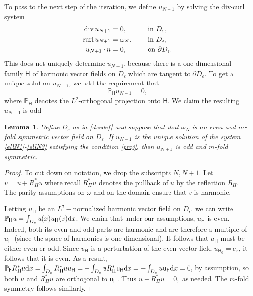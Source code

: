 \documentclass[11pt]{article}
\theoremstyle{plain}
\numberwithin{equation}{section}
\newtheorem{lemma}[thm]{Lemma}
\theoremstyle{remark}
\renewcommand{\div}{{\rm div}}
\newcommand{\rmd}{{\rm d}}
\newcommand{\curl}{{\rm curl}}
\newcommand{\ve}{{\varepsilon}}
\newcommand{\pa}{\partial}
\begin{document}
To pass to the next step of the iteration,
we define $u_{N+1}$ by solving the div-curl system
\begin{alignat}{2}
  \label{ellN1}
  \div \,u_{N+1} &= 0, &&\text{ in } D_\ve,\\
  \curl \,u_{N+1} &= \omega_N,&&\text{ in } D_\ve,\\
  u_{N+1}\cdot n &=0, \qquad &&\text{ on } \pa D_\ve.
  \label{ellN3}
\end{alignat}
This does not uniquely determine $u_{N+1}$, because there is a one-dimensional
family $\mathsf{H}$ of harmonic vector fields on $D_\ve$ which are tangent to $\pa D_\ve$.
To get a unique solution $u_{N+1}$, we add the requirement that
\begin{equation}
  \label{proj}
  \mathbb{P}_{\mathsf{H}} u_{N+1} = 0,
\end{equation}
where $\mathbb{P}_{\mathsf{H}}$ denotes the $L^2$-orthogonal projection onto $\mathsf{H}$. We claim the resulting $u_{N+1}$ is odd:
\begin{lemma}
  \label{}
  Define $D_\ve$ as in \eqref{dvedef} and suppose that
    that $\omega_N$ is an even and $m$-fold symmetric vector field on $D_\ve$.
    If $u_{N+1}$ is the unique solution of the system
    \eqref{ellN1}-\eqref{ellN3} satisfying the condition
    \eqref{proj}, then $u_{N+1}$ is odd and $m$-fold symmetric.
\end{lemma}
\begin{proof}
    To cut down on notation, we drop the subscripts $N, N+1$.
    Let $v  = u + R_\Pi^* u$
    where recall $R_\Pi^* u$ denotes the pullback of $u$ by 
    the reflection $R_\Pi$.
    The parity assumptions on $\omega$ and on the domain ensure that
    $v$ is harmonic.


    Letting  $u_{\mathsf{H}}$ be an $L^2-$normalized
    harmonic vector field on $D_\ve$, we can write $\mathbb{P}_{\mathsf{H}} u
    = \int_{D_\ve} u(x) u_{\mathsf{H}}(x)\rmd x$. We claim that under our assumptions,
    $u_{\mathsf{H}}$ is even. Indeed, both its even and odd parts are harmonic
    and are therefore a multiple of $u_{\mathsf{H}}$ (since the space of harmonics is one-dimensional). It follows that
    $u_{\mathsf{H}}$ must be either even or odd. Since $u_{\mathsf{H}}$ is
    a perturbation of the even vector field $u_{\mathsf{H}_0} = e_z$, 
    it follows that it is even.  As a result, $\mathbb{P}_{\mathsf{h}} R_\Pi^* u \rmd x= 
    \int_{D_\ve} R_\Pi^* u u_{\mathsf{H}} = -\int_{D_\ve} u R_\Pi^* \mathsf{u}_{\mathsf{H}} \rmd x
    = -\int_{D_\ve} u  \mathsf{u}_{\mathsf{H}}\rmd x = 0$, by assumption,
    so both $u$ and $R_\Pi^*u$ are orthogonal to $\mathsf{u}_{\mathsf{H}}$. Thus
    $u + R_\Pi^*u = 0,$ as needed. The $m$-fold symmetry follows similarly.
\end{proof}
\end{document}
